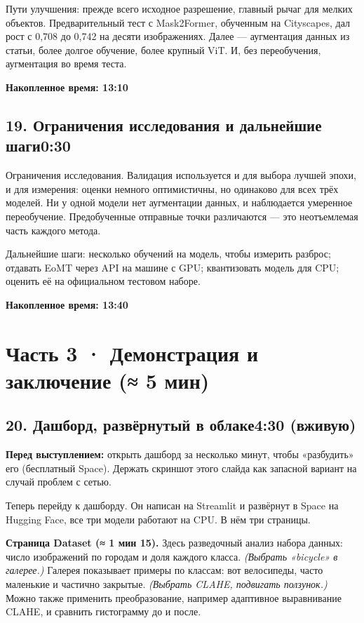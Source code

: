 \documentclass[11pt,a4paper]{article}
\newcommand{\didascalie}[1]{{\color{bodyc}\itshape #1}}
\newcommand{\cumul}[1]{\par{\hfill\small\color{accent}\bfseries #1}\par}
\newcommand{\tempo}[1]{\hfill{\normalsize\color{accent}#1}}
\begin{document}
Пути улучшения: прежде всего исходное разрешение, главный рычаг для мелких объектов. Предварительный тест с Mask2Former, обученным на Cityscapes, дал рост с 0,708 до 0,742 на десяти изображениях. Далее — аугментация данных из статьи, более долгое обучение, более крупный ViT. И, без переобучения, аугментация во время теста.

\cumul{Накопленное время: 13:10}

\subsection*{19. Ограничения исследования и дальнейшие шаги\tempo{0:30}}

Ограничения исследования. Валидация используется и для выбора лучшей эпохи, и для измерения: оценки немного оптимистичны, но одинаково для всех трёх моделей. Ни у одной модели нет аугментации данных, и наблюдается умеренное переобучение. Предобученные отправные точки различаются — это неотъемлемая часть каждого метода.

Дальнейшие шаги: несколько обучений на модель, чтобы измерить разброс; отдавать EoMT через API на машине с GPU; квантизовать модель для CPU; оценить её на официальном тестовом наборе.

\cumul{Накопленное время: 13:40}

\medskip{\color{linec}\rule{\linewidth}{0.5pt}}\medskip

\section*{Часть 3 · Демонстрация и заключение (≈ 5 мин)}

\subsection*{20. Дашборд, развёрнутый в облаке\tempo{4:30 (вживую)}}

\textbf{Перед выступлением:} открыть дашборд за несколько минут, чтобы «разбудить» его (бесплатный Space). Держать скриншот этого слайда как запасной вариант на случай проблем с сетью.

Теперь перейду к дашборду. Он написан на Streamlit и развёрнут в Space на Hugging Face, все три модели работают на CPU. В нём три страницы.

\textbf{Страница Dataset (≈ 1 мин 15).}
Здесь разведочный анализ набора данных: число изображений по городам и доля каждого класса. \didascalie{(Выбрать «bicycle» в галерее.)} Галерея показывает примеры по классам: вот велосипеды, часто маленькие и частично закрытые. \didascalie{(Выбрать CLAHE, подвигать ползунок.)} Можно также применить преобразование, например адаптивное выравнивание CLAHE, и сравнить гистограмму до и после.
\end{document}

